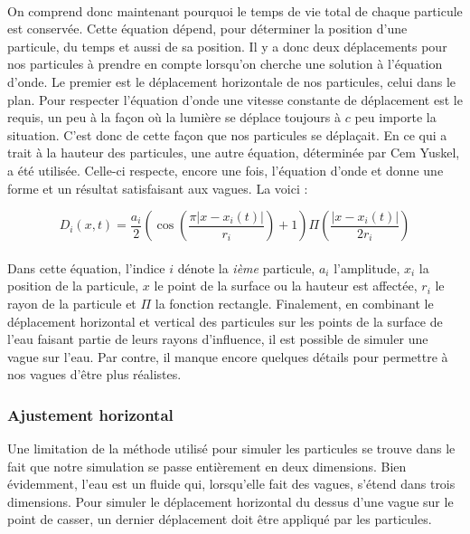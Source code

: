 \documentclass[a4paper, 12pt]{article} %
\begin{document}
	\paragraph{}
	On comprend donc maintenant pourquoi le temps de vie total de chaque particule est conservée.
	Cette équation dépend, pour déterminer la position d'une particule, du temps et aussi de sa position.
	Il y a donc deux déplacements pour nos particules à prendre en compte lorsqu'on cherche une solution à
	l'équation d'onde. Le premier est le déplacement horizontale de nos particules, celui dans le plan.
	Pour respecter l'équation d'onde une vitesse constante de déplacement est le requis, un peu à la façon
	où la lumière se déplace toujours à $c$ peu importe la situation. C'est donc de cette façon que nos particules
	se déplaçait. En ce qui a trait à la hauteur des particules, une autre équation, déterminée par Cem Yuskel,
	a été utilisée. Celle-ci respecte, encore une fois, l'équation d'onde et donne une forme et un résultat satisfaisant
	aux vagues. La voici :

	\begin{equation}
	    D_{i}(x, t) = \frac{a_{i}}{2} \left( \cos\left( \frac{\pi |x - x_{i}(t)|}{r_{i}}\right) + 1\right)
	    \Pi \left( \frac{|x - x_{i}(t)|} {2 r_{i}}\right)
	\end{equation}

	\paragraph{}
	Dans cette équation, l'indice $i$ dénote la \textit{ième} particule, $a_{i}$ l'amplitude, $x_{i}$ la position de la particule,
	$x$ le point de la surface ou la hauteur est affectée,
	$r_{i}$ le rayon de la particule et $\Pi$ la fonction rectangle. Finalement, en combinant le déplacement horizontal et vertical des particules sur 
	les points de la surface de l'eau faisant partie de leurs rayons d'influence, il est possible de simuler une vague sur l'eau.
	Par contre, il manque encore quelques détails pour permettre à nos vagues d'être plus réalistes.

	\subsubsection{Ajustement horizontal}
	Une limitation de la méthode utilisé pour simuler les particules se trouve dans le fait que notre simulation se passe 
	entièrement en deux dimensions. Bien évidemment, l'eau est un fluide qui, lorsqu'elle fait des vagues, s'étend dans trois dimensions.
	Pour simuler le déplacement horizontal du dessus d'une vague sur le point de casser, un dernier déplacement doit être appliqué
	par les particules.
\end{document}
